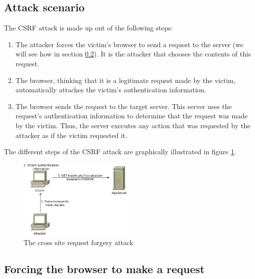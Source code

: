 \subsection{Attack scenario}

The CSRF attack is made up out of the following steps:

\begin{enumerate}
	\item The attacker forces the victim's browser to send a request to the server (we will see how in section \ref{forcing-request}). It is the attacker that chooses the contents of this request.
	\item The browser, thinking that it is a legitimate request made by the victim, automatically attaches the victim's authentication information.
	\item The browser sends the request to the target server. This server uses the request's authentication information to determine that the request was made by the victim. Thus, the server executes any action that was requested by the attacker as if the victim requested it.
\end{enumerate}

The different steps of the CSRF attack are graphically illustrated in figure \ref{fig:csrf}.

\begin{figure}[ht]
	\centering
	\includegraphics[width=0.50\textwidth]{img/csrf.png}
	\caption{The cross site request forgery attack}
	\label{fig:csrf}
\end{figure}

\subsection{Forcing the browser to make a request}\label{forcing-request}
